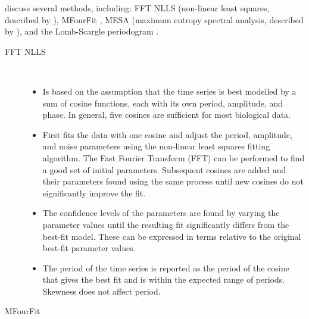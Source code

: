\textcite{zielinskiStrengthsLimitationsPeriod2014} discuss several methods, including: FFT NLLS (non-linear least squares, described by \textcite{straumeLeastSquaresAnalysisFluorescence2002}), MFourFit \parencite{edwardsQuantitativeAnalysisRegulatory2010}, MESA (maximum entropy spectral analysis, described by \textcite{burgRelationshipMaximumEntropy1972}), and the Lomb-Scargle periodogram \parencite{lombLeastsquaresFrequencyAnalysis1976}.

\begin{description}
    \item [FFT NLLS] \hfill \\

        \begin{itemize}
          \item Is based on the assumption that the time series is best modelled by a sum of cosine functions, each with its own period, amplitude, and phase.
                In general, five cosines are sufficient for most biological data.
          \item First fits the data with one cosine and adjust the period, amplitude, and noise parameters using the non-linear least squares fitting algorithm.
                The Fast Fourier Transform (FFT) can be performed to find a good set of initial parameters.
                Subsequent cosines are added and their parameters found using the same process until new cosines do not significantly improve the fit.
          \item The confidence levels of the parameters are found by varying the parameter values until the resulting fit significantly differs from the best-fit model.
                These can be expressed in terms relative to the original best-fit parameter values.
          \item The period of the time series is reported as the period of the cosine that gives the best fit and is within the expected range of periods.
                Skewness does not affect period.
        \end{itemize}

    \item [MFourFit] \hfill \\


\end{description}
